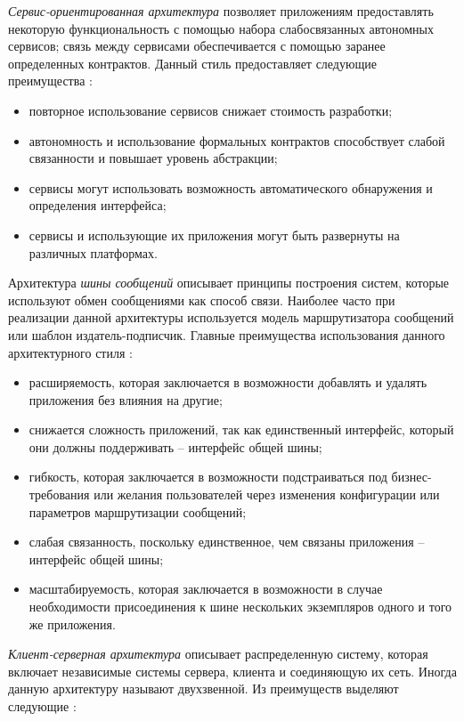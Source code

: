 \emph{Сервис-ориентированная архитектура} позволяет приложениям предоставлять некоторую функциональность с помощью набора слабосвязанных автономных сервисов; связь между сервисами обеспечивается с помощью заранее определенных контрактов. Данный стиль предоставляет следующие преимущества \cite{application_architecture_guide}:

\begin{itemize}
	\item повторное использование сервисов снижает стоимость разработки;
	\item автономность и использование формальных контрактов способствует слабой связанности и повышает уровень абстракции;
	\item сервисы могут использовать возможность автоматического обнаружения и определения интерфейса;
	\item сервисы и использующие их приложения могут быть развернуты на различных платформах.
\end{itemize}

Архитектура \emph{шины сообщений} описывает принципы построения систем, которые используют обмен сообщениями как способ связи. Наиболее часто при реализации данной архитектуры используется модель маршрутизатора сообщений или шаблон издатель-подписчик. Главные преимущества использования данного архитектурного стиля \cite{application_architecture_guide}:

\begin{itemize}
	\item расширяемость, которая заключается в возможности добавлять и удалять приложения без влияния на другие;
	\item снижается сложность приложений, так как единственный интерфейс, который они должны поддерживать -- интерфейс общей шины;
	\item гибкость, которая заключается в возможности подстраиваться под биз\-нес-требования или желания пользователей через изменения конфигурации или параметров маршрутизации сообщений;
	\item слабая связанность, поскольку единственное, чем связаны приложения -- интерфейс общей шины;
	\item масштабируемость, которая заключается в возможности в случае необходимости присоединения к шине нескольких экземпляров одного и того же приложения.
\end{itemize}

\emph{Клиент-серверная архитектура} описывает распределенную систему, которая включает независимые системы сервера, клиента и соединяющую их сеть. Иногда данную архитектуру называют двухзвенной. Из преимуществ выделяют следующие \cite{architecture_volosevich}:

